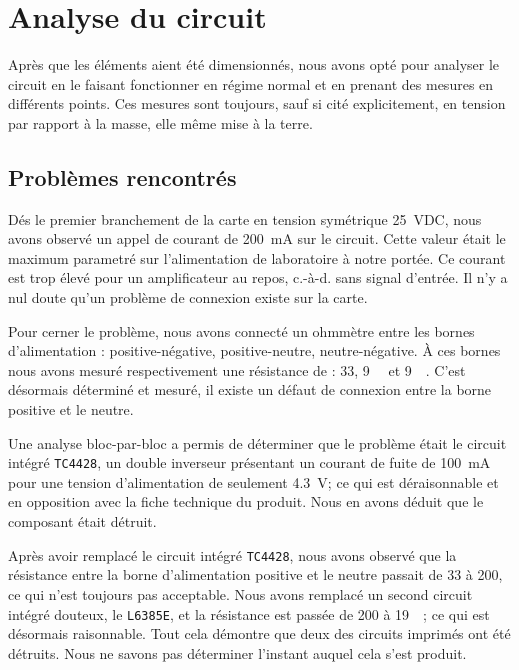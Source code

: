 \documentclass[10pt, oneside, a4paper]{article}
\begin{document}
\section{Analyse du circuit}
Après que les éléments aient été dimensionnés, nous avons opté pour analyser le circuit en le faisant fonctionner en régime normal et en prenant des mesures en différents points.
Ces mesures sont toujours, sauf si cité explicitement, en tension par rapport à la masse, elle même mise à la terre.

\subsection{Problèmes rencontrés}
\label{sec:problems}
Dés le premier branchement de la carte en tension symétrique \pm\SI{25}{\volt}DC,
nous avons observé un appel de courant de \SI{200}{\milli\ampere} sur le circuit.
Cette valeur était le maximum parametré sur l'alimentation de laboratoire à notre portée.
Ce courant est trop élevé pour un amplificateur au repos, c.-à-d. sans signal d'entrée.
Il n'y a nul doute qu'un problème de connexion existe sur la carte.

Pour cerner le problème, nous avons connecté un ohmmètre entre les bornes d'alimentation : positive-négative, positive-neutre, neutre-négative.
À ces bornes nous avons mesuré respectivement une résistance de : \SI{33}{\Omega}, \SI{9}{\kilo\Omega} et \SI{9}{\kilo\Omega}.
C'est désormais déterminé et mesuré, il existe un défaut de connexion entre la borne positive et le neutre.

Une analyse bloc-par-bloc a permis de déterminer que le problème était le circuit intégré \texttt{TC4428}, un double inverseur présentant un courant de fuite de \SI{100}{\milli\ampere} pour une tension d'alimentation de seulement \SI{4.3}{\volt};
ce qui est déraisonnable et en opposition avec la fiche technique du produit.
Nous en avons déduit que le composant était détruit.

Après avoir remplacé le circuit intégré \texttt{TC4428}, nous avons observé que la résistance entre la borne d'alimentation positive et le neutre passait de \SI{33}{\Omega} à \SI{200}{\Omega}, ce qui n'est toujours pas acceptable.
Nous avons remplacé un second circuit intégré douteux, le \verb|L6385E|, et la résistance est passée de \SI{200}{\Omega} à \SI{19}{\kilo\Omega}; ce qui est désormais raisonnable.
Tout cela démontre que deux des circuits imprimés ont été détruits.
Nous ne savons pas déterminer l'instant auquel cela s'est produit.
\end{document}
